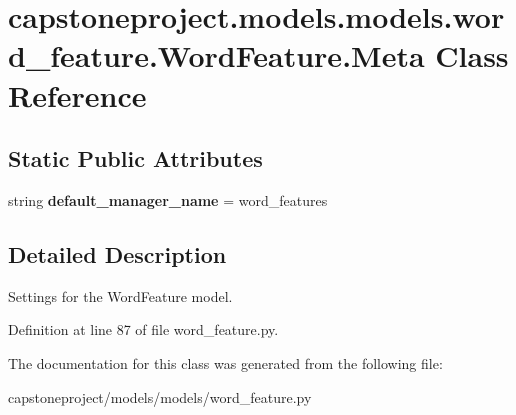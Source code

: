 \hypertarget{classcapstoneproject_1_1models_1_1models_1_1word__feature_1_1_word_feature_1_1_meta}{}\section{capstoneproject.\+models.\+models.\+word\+\_\+feature.\+Word\+Feature.\+Meta Class Reference}
\label{classcapstoneproject_1_1models_1_1models_1_1word__feature_1_1_word_feature_1_1_meta}
\subsection*{Static Public Attributes}
\begin{DoxyCompactItemize}
\item 
\mbox{\label{classcapstoneproject_1_1models_1_1models_1_1word__feature_1_1_word_feature_1_1_meta_a5d2abff68d42a610501075c1ce426fcb}} 
string {\bfseries default\+\_\+manager\+\_\+name} = \textquotesingle{}word\+\_\+features\textquotesingle{}
\end{DoxyCompactItemize}


\subsection{Detailed Description}
\begin{DoxyVerb}Settings for the WordFeature model.\end{DoxyVerb}
 

Definition at line 87 of file word\+\_\+feature.\+py.



The documentation for this class was generated from the following file\+:\begin{DoxyCompactItemize}
\item 
capstoneproject/models/models/word\+\_\+feature.\+py\end{DoxyCompactItemize}
